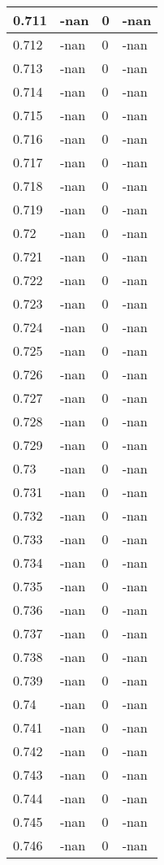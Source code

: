 \documentclass[a4paper,14pt]{extarticle}
\begin{document}
\begin{longtable}{||m{3cm}||m{3cm}|m{3cm}||m{3cm}||}
\hline
0.711 & -nan & 0 & -nan\\
\hline
0.712 & -nan & 0 & -nan\\
\hline
0.713 & -nan & 0 & -nan\\
\hline
0.714 & -nan & 0 & -nan\\
\hline
0.715 & -nan & 0 & -nan\\
\hline
0.716 & -nan & 0 & -nan\\
\hline
0.717 & -nan & 0 & -nan\\
\hline
0.718 & -nan & 0 & -nan\\
\hline
0.719 & -nan & 0 & -nan\\
\hline
0.72 & -nan & 0 & -nan\\
\hline
0.721 & -nan & 0 & -nan\\
\hline
0.722 & -nan & 0 & -nan\\
\hline
0.723 & -nan & 0 & -nan\\
\hline
0.724 & -nan & 0 & -nan\\
\hline
0.725 & -nan & 0 & -nan\\
\hline
0.726 & -nan & 0 & -nan\\
\hline
0.727 & -nan & 0 & -nan\\
\hline
0.728 & -nan & 0 & -nan\\
\hline
0.729 & -nan & 0 & -nan\\
\hline
0.73 & -nan & 0 & -nan\\
\hline
0.731 & -nan & 0 & -nan\\
\hline
0.732 & -nan & 0 & -nan\\
\hline
0.733 & -nan & 0 & -nan\\
\hline
0.734 & -nan & 0 & -nan\\
\hline
0.735 & -nan & 0 & -nan\\
\hline
0.736 & -nan & 0 & -nan\\
\hline
0.737 & -nan & 0 & -nan\\
\hline
0.738 & -nan & 0 & -nan\\
\hline
0.739 & -nan & 0 & -nan\\
\hline
0.74 & -nan & 0 & -nan\\
\hline
0.741 & -nan & 0 & -nan\\
\hline
0.742 & -nan & 0 & -nan\\
\hline
0.743 & -nan & 0 & -nan\\
\hline
0.744 & -nan & 0 & -nan\\
\hline
0.745 & -nan & 0 & -nan\\
\hline
0.746 & -nan & 0 & -nan\\

\end{longtable}
\end{document}
